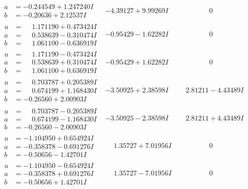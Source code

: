 \documentclass[1p]{elsarticle_modified}
\theoremstyle{definition}
\begin{document}
$$\begin{array}{c|c|c}
\begin{aligned}
a &= -0.244549 + 1.247240 I \\
b &= -0.20636 + 2.12537 I\end{aligned}
 & -4.39127 + 9.99269 I & \phantom{-0.000000 } 0 \\ \hline\begin{aligned}
u &= \phantom{-}1.171190 + 0.473424 I \\
a &= \phantom{-}0.538639 - 0.310474 I \\
b &= \phantom{-}1.061100 - 0.636919 I\end{aligned}
 & -0.95429 - 1.62282 I & \phantom{-0.000000 } 0 \\ \hline\begin{aligned}
u &= \phantom{-}1.171190 - 0.473424 I \\
a &= \phantom{-}0.538639 + 0.310474 I \\
b &= \phantom{-}1.061100 + 0.636919 I\end{aligned}
 & -0.95429 + 1.62282 I & \phantom{-0.000000 } 0 \\ \hline\begin{aligned}
u &= \phantom{-}0.703787 + 0.205389 I \\
a &= \phantom{-}0.674199 + 1.168430 I \\
b &= -0.26560 + 2.00903 I\end{aligned}
 & -3.50925 + 2.38598 I & \phantom{-}2.81211 - 4.43489 I \\ \hline\begin{aligned}
u &= \phantom{-}0.703787 - 0.205389 I \\
a &= \phantom{-}0.674199 - 1.168430 I \\
b &= -0.26560 - 2.00903 I\end{aligned}
 & -3.50925 - 2.38598 I & \phantom{-}2.81211 + 4.43489 I \\ \hline\begin{aligned}
u &= -1.104950 + 0.654924 I \\
a &= -0.358378 - 0.691276 I \\
b &= -0.50656 - 1.42701 I\end{aligned}
 & \phantom{-}1.35727 + 7.01956 I & \phantom{-0.000000 } 0 \\ \hline\begin{aligned}
u &= -1.104950 - 0.654924 I \\
a &= -0.358378 + 0.691276 I \\
b &= -0.50656 + 1.42701 I\end{aligned}
 & \phantom{-}1.35727 - 7.01956 I & \phantom{-0.000000 } 0 \\ \hline\begin{aligned}

\end{aligned}
\end{array}$$
\end{document}
